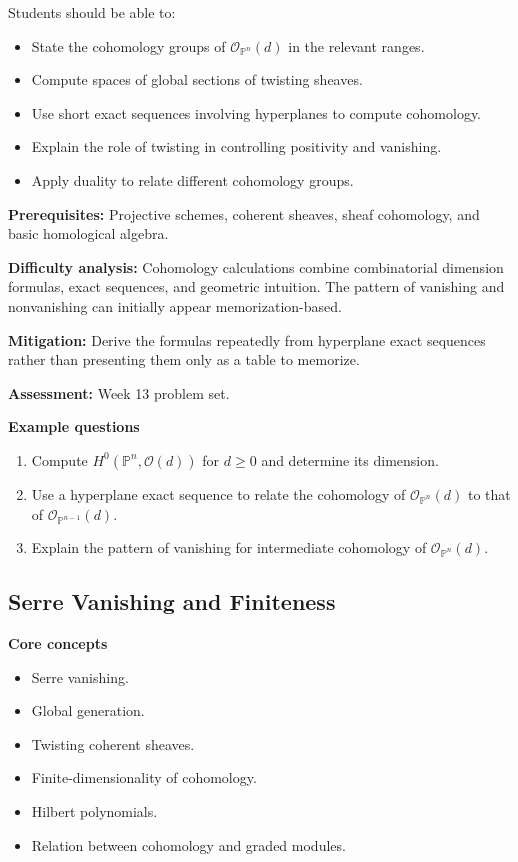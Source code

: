 \documentclass[11pt]{article}
\begin{document}
Students should be able to:
\begin{itemize}
    \item State the cohomology groups of $\mathcal{O}_{\mathbb{P}^n}(d)$ in the relevant ranges.
    \item Compute spaces of global sections of twisting sheaves.
    \item Use short exact sequences involving hyperplanes to compute cohomology.
    \item Explain the role of twisting in controlling positivity and vanishing.
    \item Apply duality to relate different cohomology groups.
\end{itemize}

\textbf{Prerequisites:} Projective schemes, coherent sheaves, sheaf cohomology, and basic homological algebra.

\textbf{Difficulty analysis:} Cohomology calculations combine combinatorial dimension formulas, exact sequences, and geometric intuition. The pattern of vanishing and nonvanishing can initially appear memorization-based.

\textbf{Mitigation:} Derive the formulas repeatedly from hyperplane exact sequences rather than presenting them only as a table to memorize.

\textbf{Assessment:} Week 13 problem set.

\textbf{Example questions}
\begin{enumerate}
    \item Compute $H^0(\mathbb{P}^n,\mathcal{O}(d))$ for $d\geq 0$ and determine its dimension.
    \item Use a hyperplane exact sequence to relate the cohomology of $\mathcal{O}_{\mathbb{P}^n}(d)$ to that of $\mathcal{O}_{\mathbb{P}^{n-1}}(d)$.
    \item Explain the pattern of vanishing for intermediate cohomology of $\mathcal{O}_{\mathbb{P}^n}(d)$.
\end{enumerate}

\subsection{Serre Vanishing and Finiteness}

\textbf{Core concepts}
\begin{itemize}
    \item Serre vanishing.
    \item Global generation.
    \item Twisting coherent sheaves.
    \item Finite-dimensionality of cohomology.
    \item Hilbert polynomials.
    \item Relation between cohomology and graded modules.
\end{itemize}
\end{document}

